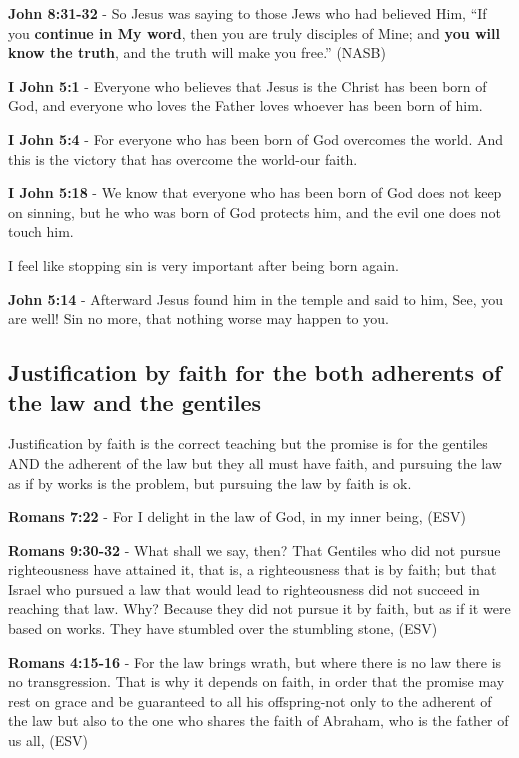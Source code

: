 \documentclass[11pt]{article}
\begin{document}
\textbf{John 8:31-32} - So Jesus was saying to those Jews who had believed Him, “If you \textbf{continue in My word}, then you are truly disciples of Mine; and \textbf{you will know the truth}, and the truth will make you free.” (NASB)

\textbf{I John 5:1} - Everyone who believes that Jesus is the Christ has been born of God, and everyone who loves the Father loves whoever has been born of him.

\textbf{I John 5:4} - For everyone who has been born of God overcomes the world. And this is the victory that has overcome the world-our faith.

\textbf{I John 5:18} - We know that everyone who has been born of God does not keep on sinning, but he who was born of God protects him, and the evil one does not touch him.

I feel like stopping sin is very important after being born again.

\textbf{John 5:14} - Afterward Jesus found him in the temple and said to him, See, you are well! Sin no more, that nothing worse may happen to you.

\subsection{Justification by faith for the both adherents of the law and the gentiles}
\label{sec:orgd298da8}
Justification by faith is the correct teaching but the promise is for the gentiles AND the adherent of the law but they all must have faith, and pursuing the law as if by works is the problem, but pursuing the law by faith is ok.

\textbf{Romans 7:22} - For I delight in the law of God, in my inner being, (ESV)

\textbf{Romans 9:30-32} - What shall we say, then? That Gentiles who did not pursue righteousness have attained it, that is, a righteousness that is by faith; but that Israel who pursued a law that would lead to righteousness did not succeed in reaching that law. Why? Because they did not pursue it by faith, but as if it were based on works. They have stumbled over the stumbling stone, (ESV)

\textbf{Romans 4:15-16} - For the law brings wrath, but where there is no law there is no transgression. That is why it depends on faith, in order that the promise may rest on grace and be guaranteed to all his offspring-not only to the adherent of the law but also to the one who shares the faith of Abraham, who is the father of us all, (ESV)
\end{document}

